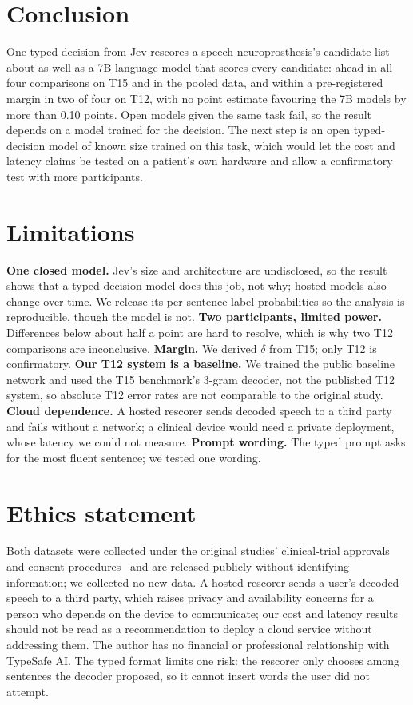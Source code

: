 \documentclass[11pt]{article}
\begin{document}
\section{Conclusion}

One typed decision from Jev rescores a speech neuroprosthesis's candidate list about as well as a 7B
language model that scores every candidate: ahead in all four comparisons on T15 and in the pooled
data, and within a pre-registered margin in two of four on T12, with no point estimate favouring
the 7B models by more than 0.10 points. Open models given the same task fail, so the result depends on
a model trained for the decision. The next step is an open typed-decision model of known size
trained on this task, which would let the cost and latency claims be tested on a patient's own
hardware and allow a confirmatory test with more participants.

\section*{Limitations}

\textbf{One closed model.} Jev's size and architecture are undisclosed, so the result shows that a
typed-decision model does this job, not why; hosted models also change over time. We release its
per-sentence label probabilities so the analysis is reproducible, though the model is not.
\textbf{Two participants, limited power.} Differences below about half a point are hard to resolve,
which is why two T12 comparisons are inconclusive. \textbf{Margin.} We derived $\delta$ from T15;
only T12 is confirmatory. \textbf{Our T12 system is a baseline.} We trained the public baseline
network and used the T15 benchmark's 3-gram decoder, not the published T12 system, so absolute T12
error rates are not comparable to the original study. \textbf{Cloud dependence.} A hosted rescorer
sends decoded speech to a third party and fails without a network; a clinical device would need a
private deployment, whose latency we could not measure. \textbf{Prompt wording.} The typed prompt
asks for the most fluent sentence; we tested one wording.

\section*{Ethics statement}

Both datasets were collected under the original studies' clinical-trial approvals and consent
procedures~\citep{willett2023,card2024} and are released publicly without identifying information;
we collected no new data. A hosted rescorer sends a user's decoded speech to a third party, which
raises privacy and availability concerns for a person who depends on the device to communicate; our
cost and latency results should not be read as a recommendation to deploy a cloud service without
addressing them. The author has no financial or professional relationship with TypeSafe AI. The typed format
limits one risk: the rescorer only chooses among sentences the
decoder proposed, so it cannot insert words the user did not attempt.
\end{document}
